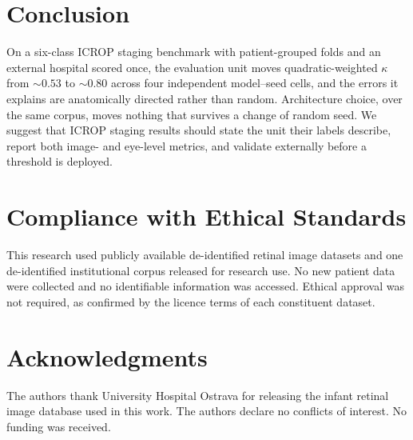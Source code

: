 \documentclass{article}
\begin{document}
\section{Conclusion}
On a six-class ICROP staging benchmark with patient-grouped folds and an external
hospital scored once, the evaluation unit moves quadratic-weighted $\kappa$ from
${\sim}0.53$ to ${\sim}0.80$ across four independent model--seed cells, and the
errors it explains are anatomically directed rather than random. Architecture
choice, over the same corpus, moves nothing that survives a change of random
seed. We suggest that ICROP staging results should state the unit their labels
describe, report both image- and eye-level metrics, and validate externally
before a threshold is deployed.

\section{Compliance with Ethical Standards}
This research used publicly available de-identified retinal image datasets and
one de-identified institutional corpus released for research use. No new patient
data were collected and no identifiable information was accessed. Ethical
approval was not required, as confirmed by the licence terms of each constituent
dataset.

\section{Acknowledgments}
The authors thank University Hospital Ostrava for releasing the infant retinal
image database used in this work. The authors declare no conflicts of interest.
No funding was received.
\end{document}
